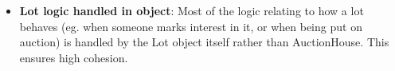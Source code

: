 \documentclass[titlepage, 12pt]{extarticle}
\begin{document}
\begin{itemize}
    \item {\bf Lot logic handled in object}: Most of the logic relating to how a lot behaves (eg. when someone marks interest in it, or when being put on auction) is handled by the Lot object itself rather than AuctionHouse. This ensures high cohesion. 
\end{itemize}



\end{document}
